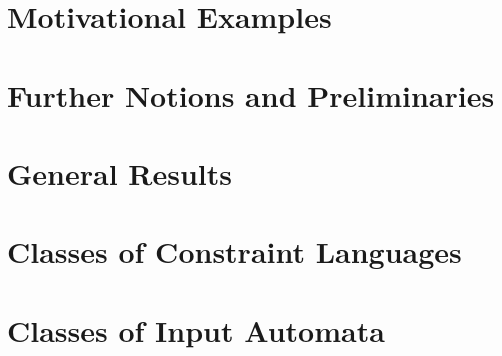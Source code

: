 
\chapter{Motivational Examples}
\label{constr_sync:sec:motivation}



\chapter{Further Notions and Preliminaries}
\label{constr_sync:chap:further_notions}



\chapter{General Results}
\label{constr_sync:chap:gen_results}



\chapter{Classes of Constraint Languages}
\label{constr_sync:chap:classes_constraint_languages}



\chapter{Classes of Input Automata}
\label{constr_sync:chap:constr_input}

